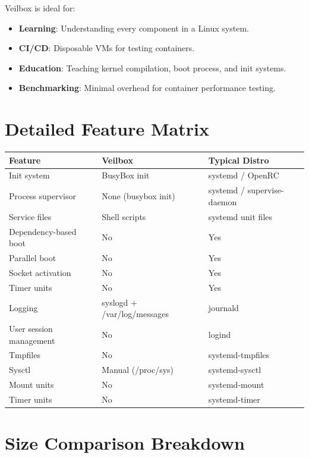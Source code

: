 Veilbox is ideal for:
\begin{itemize}[nosep]
  \item \textbf{Learning}: Understanding every component in a Linux system.
  \item \textbf{CI/CD}: Disposable VMs for testing containers.
  \item \textbf{Education}: Teaching kernel compilation, boot process, and
        init systems.
  \item \textbf{Benchmarking}: Minimal overhead for container performance
        testing.
\end{itemize}


\section{Detailed Feature Matrix}

\begin{longtable}{|p{4cm}|p{4cm}|p{4cm}|}
\hline
\textbf{Feature} & \textbf{Veilbox} & \textbf{Typical Distro} \\
\hline
Init system & BusyBox init & systemd / OpenRC \\
Process supervisor & None (busybox init) & systemd / supervise-daemon \\
Service files & Shell scripts & systemd unit files \\
Dependency-based boot & No & Yes \\
Parallel boot & No & Yes \\
Socket activation & No & Yes \\
Timer units & No & Yes \\
Logging & syslogd + /var/log/messages & journald \\
User session management & No & logind \\
Tmpfiles & No & systemd-tmpfiles \\
Sysctl & Manual (/proc/sys) & systemd-sysctl \\
Mount units & No & systemd-mount \\
Timer units & No & systemd-timer \\
\hline
\end{longtable}

\section{Size Comparison Breakdown}

